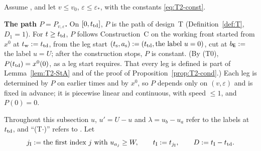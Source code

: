 Assume \MHT, and let $v\le v_0$, $\varepsilon\le\varepsilon_*$, with the constants \eqref{eq:T2-const}.

\medskip\noindent\textbf{The path $P=P_{v,\varepsilon}$.} On $[0,t_{\mathrm{td}}]$, $P$ is the path of design~T
(Definition~\ref{def:T}, $D_1=1$). For $t\ge t_{\mathrm{td}}$, $P$ follows Construction~C on the working front started from $x^0$ at $t_{\mathrm w}:=t_{\mathrm{td}}$, from
the leg start $(t_{\mathrm s},a_{\mathrm s}):=(t_{\mathrm{td}},\text{the label }u=0)$, cut at $b_{\mathsf E}:=$ the label $u=U$; after the construction stops,
$P$ is constant. (By (T0), $P(t_{\mathrm{td}})=x^0(0)$, as a leg start requires. That every leg is defined is part of
Lemma~\ref{lem:T2-StA} and of the proof of Proposition~\ref{prop:T2-cond}.) Each leg is determined by $P$ on earlier times and by
$x^0$, so $P$ depends only on $(v,\varepsilon)$ and is fixed in advance; it is piecewise linear and continuous, with speed
$\le1$, and $P(0)=0$.

Throughout this subsection $u$, $u'=U-u$ and $\lambda=u_b-u_a$ refer to the labels at $t_{\mathrm{td}}$, and ``(T$\cdot$)'' refers to \MHT.
Let
\[
j_{\mathrm I}:=\text{the first index $j$ with }u_{a_j}\ge W,\qquad t_{\mathrm I}:=t_{j_{\mathrm I}},\qquad D:=t_{\mathrm I}-t_{\mathrm{td}} .
\]

